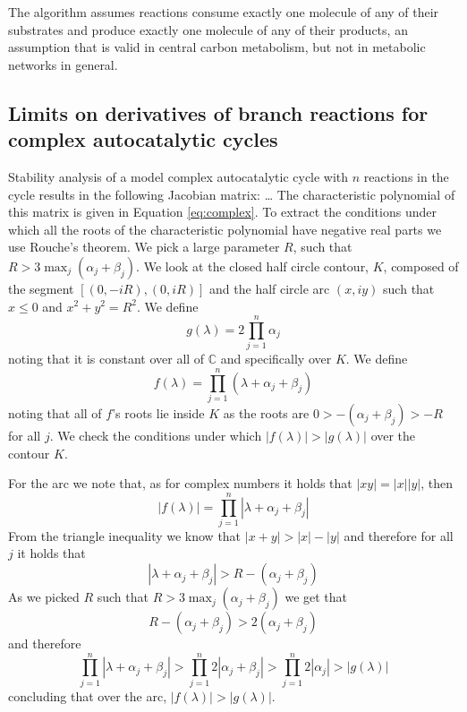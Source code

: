  The algorithm assumes reactions consume exactly one molecule of any of their substrates and produce exactly one molecule of any of their products, an assumption that is valid in central carbon metabolism, but not in metabolic networks in general.
  
  \subsection{Limits on derivatives of branch reactions for complex autocatalytic cycles}
  Stability analysis of a model complex autocatalytic cycle with $n$ reactions in the cycle results in the following Jacobian matrix:
  \ldots
  The characteristic polynomial of this matrix is given in Equation \ref{eq:complex}.
  To extract the conditions under which all the roots of the characteristic polynomial have negative real parts we use Rouche's theorem.
  We pick a large parameter $R$, such that $R>3\max_j(\alpha_j+\beta_j)$.
  We look at the closed half circle contour, $K$, composed of the segment $[(0,-iR),(0,iR)]$ and the half circle arc $(x,iy)$ such that $x\leq 0$ and $x^2+y^2=R^2$.
  We define 
  \begin{equation*}
      g(\lambda)=2\prod_{j=1}^n\alpha_j
  \end{equation*}
  noting that it is constant over all of $\mathbb{C}$ and specifically over $K$.
  We define
  \begin{equation*}
      f(\lambda)=\prod_{j=1}^n(\lambda+\alpha_j+\beta_j)
  \end{equation*}
  noting that all of $f$'s roots lie inside $K$ as the roots are $0>-(\alpha_j+\beta_j)>-R$ for all $j$.
  We check the conditions under which $|f(\lambda)|>|g(\lambda)|$ over the contour $K$.

  For the arc we note that, as for complex numbers it holds that $|xy|=|x||y|$, then 
  \begin{equation*}
      |f(\lambda)|=\prod_{j=1}^n|\lambda+\alpha_j+\beta_j|
  \end{equation*}
  From the triangle inequality we know that $|x+y|>|x|-|y|$ and therefore for all $j$ it holds that 
  \begin{equation*}
      |\lambda+\alpha_j+\beta_j|>R-(\alpha_j+\beta_j)
  \end{equation*}
  As we picked $R$ such that $R>3\max_j(\alpha_j+\beta_j)$ we get that 
  \begin{equation*}
      R-(\alpha_j+\beta_j)>2(\alpha_j+\beta_j)
  \end{equation*}
  and therefore 
  \begin{equation*}
      \prod_{j=1}^n|\lambda+\alpha_j+\beta_j|>\prod_{j=1}^n2|\alpha_j+\beta_j|>\prod_{j=1}^n2|\alpha_j|>|g(\lambda)|
  \end{equation*}
  concluding that over the arc, $|f(\lambda)|>|g(\lambda)|$.

